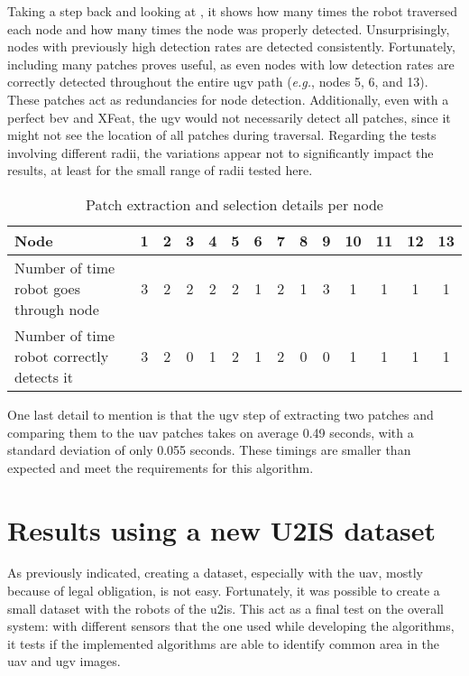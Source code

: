 Taking a step back and looking at , it shows how many times the robot traversed
each node and how many times the node was properly detected.
Unsurprisingly, nodes with previously high detection rates are detected consistently.
Fortunately, including many patches proves useful, as even nodes with low detection rates are correctly
detected throughout the entire \gls{ugv} path (\textit{e.g.}, nodes 5, 6, and 13).
These patches act as redundancies for node detection.
Additionally, even with a perfect \gls{bev} and XFeat, the \gls{ugv} would not necessarily detect all patches, since it
might not see the location of all patches during traversal.
Regarding the tests involving different radii, the variations appear not to significantly impact the results, at least for
the small range of radii tested here.

\begin{table}[ht]
    \centering
    \begin{tabular}{|>{\raggedright\arraybackslash}p{3cm}|c|c|c|c|c|c|c|c|c|c|c|c|c|}
        \hline
        Node                                      & 1 & 2 & 3 & 4 & 5 & 6 & 7 & 8 & 9 & 10 & 11 & 12 & 13 \\ \hline
        Number of time robot goes through node    & 3 & 2 & 2 & 2 & 2 & 1 & 2 & 1 & 3 & 1  & 1  & 1  & 1  \\ \hline
        Number of time robot correctly detects it & 3 & 2 & 0 & 1 & 2 & 1 & 2 & 0 & 0 & 1  & 1  & 1  & 1  \\ \hline
    \end{tabular}
    \caption{Patch extraction and selection details per node}
    \label{tab:montmorency:node_detection}
\end{table}

One last detail to mention is that the \gls{ugv} step of extracting two patches and comparing them to the \gls{uav}
patches takes on average 0.49 seconds, with a standard deviation of only 0.055 seconds.
These timings are smaller than expected and meet the requirements for this algorithm.



\section{Results using a new U2IS dataset}

As previously indicated, creating a dataset, especially with the \gls{uav}, mostly because of legal obligation, is not easy.
Fortunately, it was possible to create a small dataset with the robots of the \gls{u2is}.
This act as a final test on the overall system: with different sensors that the one used while developing the algorithms, it tests if the
implemented algorithms are able to identify common area in the \gls{uav} and \gls{ugv} images.

